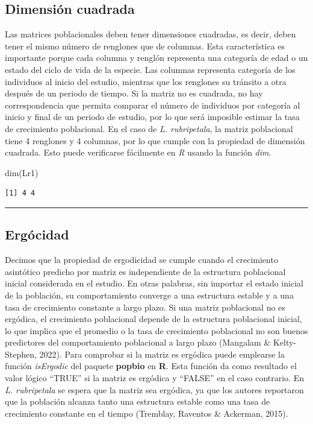 \documentclass[
  12pt,
  letterpaper,
]{book}
\newenvironment{Shaded}{\begin{snugshade}}{\end{snugshade}}
\newcommand{\FunctionTok}[1]{\textcolor[rgb]{0.28,0.35,0.67}{#1}}
\newcommand{\NormalTok}[1]{\textcolor[rgb]{0.00,0.23,0.31}{#1}}
\begin{document}
\subsection{Dimensión cuadrada}\label{dimensiuxf3n-cuadrada}

Las matrices poblacionales deben tener dimensiones cuadradas, es decir,
deben tener el mismo número de renglones que de columnas. Esta
característica es importante porque cada columna y renglón representa
una categoría de edad o un estado del ciclo de vida de la especie. Las
columnas representa categoría de los individuos al inicio del estudio,
mientras que los renglones su tránsito a otra después de un periodo de
tiempo. Si la matriz no es cuadrada, no hay correspondencia que permita
comparar el número de individuos por categoría al inicio y final de un
periodo de estudio, por lo que será imposible estimar la tasa de
crecimiento poblacional. En el caso de \emph{L. rubripetala}, la matriz
poblacional tiene 4 renglones y 4 columnas, por lo que cumple con la
propiedad de dimensión cuadrada. Esto puede verificarse fácilmente en
\emph{R} usando la función \emph{dim}.

\begin{Shaded}
\begin{Highlighting}[]
\FunctionTok{dim}\NormalTok{(Lr1)}
\end{Highlighting}
\end{Shaded}

\begin{verbatim}
[1] 4 4
\end{verbatim}

\begin{center}\rule{0.5\linewidth}{0.5pt}\end{center}

\subsection{Ergócidad}\label{erguxf3cidad}

Decimos que la propiedad de ergodicidad se cumple cuando el crecimiento
asintótico predicho por matriz es independiente de la estructura
poblacional inicial considerada en el estudio. En otras palabras, sin
importar el estado inicial de la población, su comportamiento converge a
una estructura estable y a una tasa de crecimiento constante a largo
plazo. Si una matriz poblacional no es ergódica, el crecimiento
poblacional depende de la estructura poblacional inicial, lo que implica
que el promedio o la tasa de crecimiento poblacional no son buenos
predictores del comportamiento poblacional a largo plazo (Mangalam \&
Kelty-Stephen, 2022). Para comprobar si la matriz es ergódica puede
emplearse la función \emph{isErgodic} del paquete \textbf{popbio} en
\textbf{R}. Esta función da como resultado el valor lógico ``TRUE'' si
la matriz es ergódica y ``FALSE'' en el caso contrario. En \emph{L.
rubripetala} se espera que la matriz sea ergódica, ya que los autores
reportaron que la población alcanza tanto una estructura estable como
una tasa de crecimiento constante en el tiempo (Tremblay, Raventos \&
Ackerman, 2015).
\end{document}

